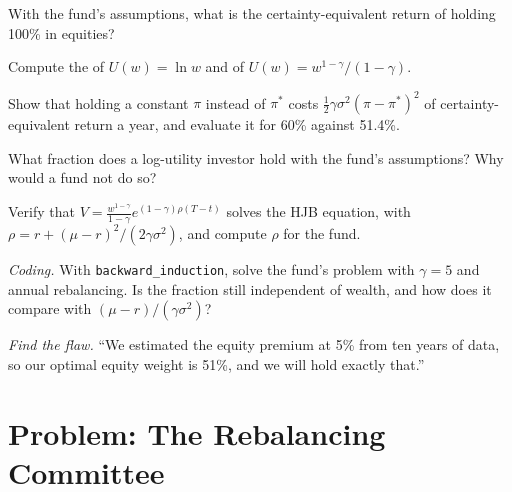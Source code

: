 \begin{exercise}[$\star$]\label{exo:qm:stochastic-control:2}
With the fund's assumptions, what is the certainty-equivalent return of holding 100\% in equities?
\end{exercise}

\begin{exercise}[$\star$]\label{exo:qm:stochastic-control:3}
Compute the  of $U(w) = \ln w$ and of $U(w) = w^{1-\gamma}/(1 - \gamma)$.
\end{exercise}

\begin{exercise}[$\star\star$]\label{exo:qm:stochastic-control:4}
Show that holding a constant $\pi$ instead of $\pi^*$ costs $\tfrac12\gamma\sigma^2(\pi - \pi^*)^2$ of certainty-equivalent return a year,
and evaluate it for 60\% against 51.4\%.
\end{exercise}

\begin{exercise}[$\star\star$]\label{exo:qm:stochastic-control:5}
What fraction does a log-utility investor hold with the fund's assumptions? Why would a fund not do so?
\end{exercise}

\begin{exercise}[$\star\star$]\label{exo:qm:stochastic-control:6}
Verify that $V = \frac{w^{1-\gamma}}{1-\gamma}e^{(1-\gamma)\rho(T-t)}$ solves the HJB equation, with $\rho = r + (\mu - r)^2/(2\gamma\sigma^2)$, and
compute $\rho$ for the fund.
\end{exercise}

\begin{exercise}[$\star\star\star$]\label{exo:qm:stochastic-control:7}
\emph{Coding.} With \texttt{backward\_induction}, solve the fund's problem with $\gamma = 5$ and annual rebalancing. Is
the fraction still independent of wealth, and how does it compare with $(\mu - r)/(\gamma\sigma^2)$?
\end{exercise}

\begin{exercise}[$\star\star\star$]\label{exo:qm:stochastic-control:8}
\emph{Find the flaw.} ``We estimated the equity premium at 5\% from ten years of data, so our optimal equity weight is
51\%, and we will hold exactly that.''
\end{exercise}

\section{Problem: The Rebalancing Committee}


